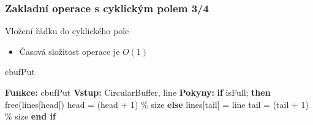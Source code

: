 \documentclass[]{fitthesispresn}
\begin{document}
    \begin{frame}
        \frametitle{Zakladní operace s cyklickým polem 3/4}
        Vložení řádku do cyklického pole
        \begin{itemize}
            \item Časová složitost operace je $O(1)$
        \end{itemize}
        \begin{algorithm}[H]
        \caption{cbufPut}
        \label{alg:cbufPut}
        \begin{algorithmic}[1]
            \State \textbf{Funkce:} cbufPut
            \State \textbf{Vstup:} CircularBuffer, line
            \State \textbf{Pokyny:}
            \State \hspace{\algorithmicindent} \textbf{if} isFull; \textbf{then}
            \State \hspace{\algorithmicindent} \hspace{\algorithmicindent} free(lines[head])
            \State \hspace{\algorithmicindent} \hspace{\algorithmicindent} head = (head + 1) \% size
            \State \hspace{\algorithmicindent} \textbf{else}
            \State \hspace{\algorithmicindent} \hspace{\algorithmicindent}  lines[tail] = line
            \State \hspace{\algorithmicindent} \hspace{\algorithmicindent}  tail = (tail + 1) \% size
            \State \hspace{\algorithmicindent} \textbf{end if}
        \end{algorithmic}
        \end{algorithm}
    \end{frame}
\end{document}
